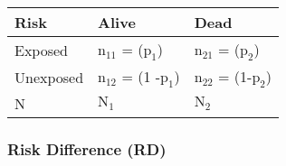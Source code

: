 \documentclass[]{article}
\begin{document}
\begin{longtable}[]{@{}lll@{}}
\toprule
\begin{minipage}[b]{0.24\columnwidth}\raggedright
Risk\strut
\end{minipage} & \begin{minipage}[b]{0.33\columnwidth}\raggedright
Alive\strut
\end{minipage} & \begin{minipage}[b]{0.33\columnwidth}\raggedright
Dead\strut
\end{minipage}\tabularnewline
\midrule
\endhead
\begin{minipage}[t]{0.24\columnwidth}\raggedright
Exposed\strut
\end{minipage} & \begin{minipage}[t]{0.33\columnwidth}\raggedright
\(\text{n}_{11}\) = (\(\text{p}_{1}\))\strut
\end{minipage} & \begin{minipage}[t]{0.33\columnwidth}\raggedright
\(\text{n}_{21}\) = (\(\text{p}_{2}\))\strut
\end{minipage}\tabularnewline
\begin{minipage}[t]{0.24\columnwidth}\raggedright
Unexposed\strut
\end{minipage} & \begin{minipage}[t]{0.33\columnwidth}\raggedright
\(\text{n}_{12}\) = (1 -\(\text{p}_{1}\))\strut
\end{minipage} & \begin{minipage}[t]{0.33\columnwidth}\raggedright
\(\text{n}_{22}\) = (1-\(\text{p}_{2}\))\strut
\end{minipage}\tabularnewline
\begin{minipage}[t]{0.24\columnwidth}\raggedright
N\strut
\end{minipage} & \begin{minipage}[t]{0.33\columnwidth}\raggedright
\(\text{N}_{1}\)\strut
\end{minipage} & \begin{minipage}[t]{0.33\columnwidth}\raggedright
\(\text{N}_{2}\)\strut
\end{minipage}\tabularnewline
\bottomrule
\end{longtable}

\hypertarget{risk-difference-rd}{%
\subsubsection{Risk Difference (RD)}\label{risk-difference-rd}}
\end{document}

